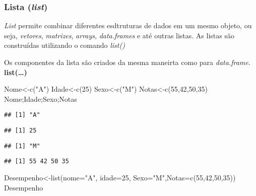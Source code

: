 \documentclass[
]{book}
\newenvironment{Shaded}{\begin{snugshade}}{\end{snugshade}}
\newcommand{\AttributeTok}[1]{\textcolor[rgb]{0.77,0.63,0.00}{#1}}
\newcommand{\DecValTok}[1]{\textcolor[rgb]{0.00,0.00,0.81}{#1}}
\newcommand{\FunctionTok}[1]{\textcolor[rgb]{0.00,0.00,0.00}{#1}}
\newcommand{\NormalTok}[1]{#1}
\newcommand{\OtherTok}[1]{\textcolor[rgb]{0.56,0.35,0.01}{#1}}
\newcommand{\StringTok}[1]{\textcolor[rgb]{0.31,0.60,0.02}{#1}}
\begin{document}
\hypertarget{lista-list}{%
\subsubsection{\texorpdfstring{Lista (\emph{list})}{Lista (list)}}\label{lista-list}}

\emph{List} permite combinar diferentes esdtruturas de dados em um mesmo objeto, ou seja, \emph{vetores}, \emph{matrizes}, \emph{arrays}, \emph{data.frames} e até outras listas.
As listas são construídas utilizando o comando \emph{list()}

Os componentes da lista são criados da mesma maneirta como para \emph{data.frame}.
\textbf{list(\ldots)}

\begin{Shaded}
\begin{Highlighting}[]
\NormalTok{Nome}\OtherTok{\textless{}{-}}\FunctionTok{c}\NormalTok{(}\StringTok{"A"}\NormalTok{)}
\NormalTok{Idade}\OtherTok{\textless{}{-}}\FunctionTok{c}\NormalTok{(}\DecValTok{25}\NormalTok{)}
\NormalTok{Sexo}\OtherTok{\textless{}{-}}\FunctionTok{c}\NormalTok{(}\StringTok{"M"}\NormalTok{)}
\NormalTok{Notas}\OtherTok{\textless{}{-}}\FunctionTok{c}\NormalTok{(}\DecValTok{55}\NormalTok{,}\DecValTok{42}\NormalTok{,}\DecValTok{50}\NormalTok{,}\DecValTok{35}\NormalTok{)}
\NormalTok{Nome;Idade;Sexo;Notas}
\end{Highlighting}
\end{Shaded}

\begin{verbatim}
## [1] "A"
\end{verbatim}

\begin{verbatim}
## [1] 25
\end{verbatim}

\begin{verbatim}
## [1] "M"
\end{verbatim}

\begin{verbatim}
## [1] 55 42 50 35
\end{verbatim}

\begin{Shaded}
\begin{Highlighting}[]
\NormalTok{Desempenho}\OtherTok{\textless{}{-}}\FunctionTok{list}\NormalTok{(}\AttributeTok{nome=}\StringTok{"A"}\NormalTok{, }\AttributeTok{idade=}\DecValTok{25}\NormalTok{, }\AttributeTok{Sexo=}\StringTok{"M"}\NormalTok{,}\AttributeTok{Notas=}\FunctionTok{c}\NormalTok{(}\DecValTok{55}\NormalTok{,}\DecValTok{42}\NormalTok{,}\DecValTok{50}\NormalTok{,}\DecValTok{35}\NormalTok{))}
\NormalTok{Desempenho}
\end{Highlighting}
\end{Shaded}
\end{document}
